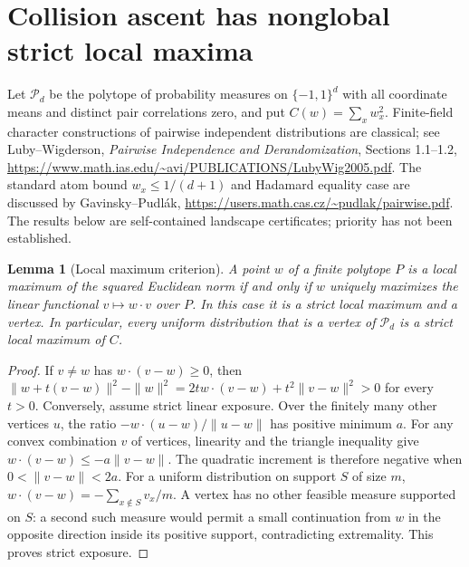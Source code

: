 \documentclass[11pt]{article}
\newtheorem{lemma}[theorem]{Lemma}
\begin{document}
\section{Collision ascent has nonglobal strict local maxima}
\label{sec:attainment-traps}
Let $\mathcal P_d$ be the polytope of probability measures on
$\{-1,1\}^d$ with all coordinate means and distinct pair correlations
zero, and put $C(w)=\sum_xw_x^2$. Finite-field character constructions
of pairwise independent distributions are classical; see Luby--Wigderson,
\emph{Pairwise Independence and Derandomization}, Sections 1.1--1.2,
\url{https://www.math.ias.edu/~avi/PUBLICATIONS/LubyWig2005.pdf}.
The standard atom bound $w_x\le1/(d+1)$ and Hadamard equality case
are discussed by Gavinsky--Pudl\'ak,
\url{https://users.math.cas.cz/~pudlak/pairwise.pdf}.
The results below are self-contained landscape certificates; priority
has not been established.

\begin{lemma}[Local maximum criterion]\label{lem:attainment-criterion}
A point $w$ of a finite polytope $P$ is a local maximum of the squared
Euclidean norm if and only if $w$ uniquely maximizes the linear
functional $v\mapsto w\cdot v$ over $P$. In this case it is a strict
local maximum and a vertex. In particular, every uniform distribution
that is a vertex of $\mathcal P_d$ is a strict local maximum of $C$.
\end{lemma}
\begin{proof}
If $v\ne w$ has $w\cdot(v-w)\ge0$, then
$\|w+t(v-w)\|^2-\|w\|^2=2t w\cdot(v-w)+t^2\|v-w\|^2>0$
for every $t>0$. Conversely, assume strict linear exposure. Over the
finitely many other vertices $u$, the ratio
$-w\cdot(u-w)/\|u-w\|$ has positive minimum $a$. For any convex
combination $v$ of vertices, linearity and the triangle inequality give
$w\cdot(v-w)\le-a\|v-w\|$. The quadratic increment is therefore
negative when $0<\|v-w\|<2a$.
For a uniform distribution on support $S$ of size $m$,
$w\cdot(v-w)=-\sum_{x\notin S}v_x/m$. A vertex has no other feasible
measure supported on $S$: a second such measure would permit a small
continuation from $w$ in the opposite direction inside its positive
support, contradicting extremality. This proves strict exposure.
\end{proof}
\end{document}
